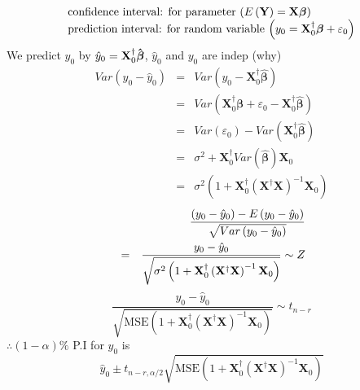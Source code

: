 \documentclass{article}
\begin{document}
\begin{equation*}
\begin{tabular}{l}
confidence interval: for parameter $\left( E\left( \mathbf{Y}\right) =%
\mathbf{X\beta }\right) $ \\ 
prediction interval: for random variable $\left( y_{0}=\mathbf{X}%
_{0}^{\dagger }\mathbf{\beta }+\varepsilon _{0}\right) $%
\end{tabular}%
\end{equation*}%
\newline
We predict $y_{0}$ by $\hat{y}_{0}=\mathbf{X}_{0}^{\dagger }\mathbf{\hat{%
\beta}}$, $\hat{y}_{0}$ and $y_{0}$ are indep (why)%
\begin{eqnarray*}
Var\left( y_{0}-\hat{y}_{0}\right) &=&Var\left( y_{0}-\mathbf{X}%
_{0}^{\dagger }\mathbf{\hat{\beta}}\right) \\
&=&Var\left( \mathbf{X}_{0}^{\dagger }\mathbf{\beta }+\varepsilon _{0}-%
\mathbf{X}_{0}^{\dagger }\mathbf{\hat{\beta}}\right) \\
&=&Var\left( \varepsilon _{0}\right) -Var\left( \mathbf{X}_{0}^{\dagger }%
\mathbf{\hat{\beta}}\right) \\
&=&\sigma ^{2}+\mathbf{X}_{0}^{\dagger }Var\left( \mathbf{\hat{\beta}}%
\right) \mathbf{X}_{0} \\
&=&\sigma ^{2}\left( 1+\mathbf{X}_{0}^{\dagger }\left( \mathbf{X}^{\dagger }%
\mathbf{X}\right) ^{-1}\mathbf{X}_{0}\right)
\end{eqnarray*}%
\begin{eqnarray*}
&&\frac{\left( y_{0}-\hat{y}_{0}\right) -E\left( y_{0}-\hat{y}_{0}\right) }{%
\sqrt{Var\left( y_{0}-\hat{y}_{0}\right) }} \\
&=&\frac{y_{0}-\hat{y}_{0}}{\sqrt{\sigma ^{2}\left( 1+\mathbf{X}%
_{0}^{\dagger }\left( \mathbf{X}^{\dagger }\mathbf{X}\right) ^{-1}\mathbf{X}%
_{0}\right) }}\sim Z
\end{eqnarray*}%
\begin{equation*}
\frac{y_{0}-\hat{y}_{0}}{\sqrt{\text{MSE}\left( 1+\mathbf{X}_{0}^{\dagger
}\left( \mathbf{X}^{\dagger }\mathbf{X}\right) ^{-1}\mathbf{X}_{0}\right) }}%
\sim t_{n-r}
\end{equation*}%
$\therefore \left( 1-\alpha \right) \%$ P.I for $y_{0}$ is%
\begin{equation*}
\hat{y}_{0}\pm t_{n-r,\alpha /2}\sqrt{\text{MSE}\left( 1+\mathbf{X}%
_{0}^{\dagger }\left( \mathbf{X}^{\dagger }\mathbf{X}\right) ^{-1}\mathbf{X}%
_{0}\right) }
\end{equation*}
\end{document}
